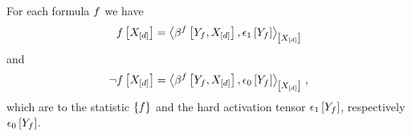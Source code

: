 \begin{theorem}
    \label{the:formulaAsCANetwork}
    For each formula $f$ we have
    \begin{align*}
        \formulaat{\shortcatvariables}
        = \contractionof{\bencodingofat{\formula}{\formulavar,\shortcatvariables},\tbasisat{\formulavar}}{\shortcatvariables}
    \end{align*}
    and
    \begin{align*}
        \lnot\formulaat{\shortcatvariables}
        = \contractionof{\bencodingofat{\formula}{\formulavar,\shortcatvariables},\fbasisat{\formulavar}}{\shortcatvariables} \, ,
    \end{align*}
    which are \ComputationActivationNetworks{} to the statistic $\{f\}$ and the hard activation tensor $\epsilon_{1}\left[Y_{f}\right]$, respectively $\epsilon_{0}\left[Y_{f}\right]$.
\end{theorem}
